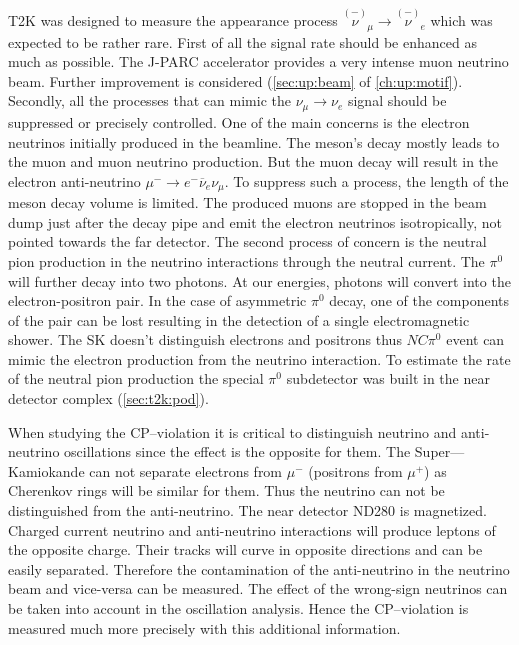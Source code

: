 \documentclass[../main.tex]{subfiles}
\begin{document}
T2K was designed to measure the appearance process $\overset{\scriptscriptstyle(-)}{\nu}_\mu\to\overset{\scriptscriptstyle(-)}{\nu}_e$ which was expected to be rather rare. First of all the signal rate should be enhanced as much as possible. The J-PARC accelerator provides a very intense muon neutrino beam. Further improvement is considered (\autoref{sec:up:beam} of \autoref{ch:up:motif}). Secondly, all the processes that can mimic the $\nu_\mu\to\nu_e$ signal should be suppressed or precisely controlled. One of the main concerns is the electron neutrinos initially produced in the beamline. The meson's decay mostly leads to the muon and muon neutrino production. But the muon decay will result in the electron anti-neutrino $\mu^-\to e^-\overline{\nu}_e\nu_\mu$. To suppress such a process, the length of the meson decay volume is limited. The produced muons are stopped in the beam dump just after the decay pipe and emit the electron neutrinos isotropically, not pointed towards the far detector. The second process of concern is the neutral pion production in the neutrino interactions through the neutral current. The $\pi^0$ will further decay into two photons. At our energies, photons will convert into the electron-positron pair. In the case of asymmetric $\pi^0$ decay, one of the components of the pair can be lost resulting in the detection of a single electromagnetic shower. The SK doesn't distinguish electrons and positrons thus $NC\pi^0$ event can mimic the electron production from the neutrino interaction. To estimate the rate of the neutral pion production the special $\pi^0$ subdetector was built in the near detector complex (\autoref{sec:t2k:pod}).

When studying the CP--violation it is critical to distinguish neutrino and anti-neutrino oscillations since the effect is the opposite for them. The Super---Kamiokande can not separate electrons from $\mu^-$ (positrons from $\mu^+$) as Cherenkov rings will be similar for them. Thus the neutrino can not be distinguished from the anti-neutrino. The near detector ND280 is magnetized. Charged current neutrino and anti-neutrino interactions will produce leptons of the opposite charge. Their tracks will curve in opposite directions and can be easily separated. Therefore the contamination of the anti-neutrino in the neutrino beam and vice-versa can be measured. The effect of the wrong-sign neutrinos can be taken into account in the oscillation analysis. Hence the CP--violation is measured much more precisely with this additional information.
\end{document}
